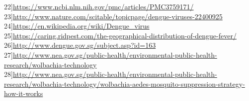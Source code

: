 \documentclass[11pt]{exam}
\begin{document}
 22]\url{https://www.ncbi.nlm.nih.gov/pmc/articles/PMC3759171/}\\
 23]\url{http://www.nature.com/scitable/topicpage/dengue-viruses-22400925}\\
 24]\url{https://en.wikipedia.org/wiki/Dengue_virus}\\
 25]\url{https://caring.ridpest.com/the-geographical-distribution-of-dengue-fever/}\\
 26]\url{http://www.dengue.gov.sg/subject.asp?id=163} \\
 27]\url{http://www.nea.gov.sg/public-health/environmental-public-health-research/wolbachia-technology} \\
 28]\url{http://www.nea.gov.sg/public-health/environmental-public-health-research/wolbachia-technology/wolbachia-aedes-mosquito-suppression-strategy-how-it-works} \\
\end{document}
